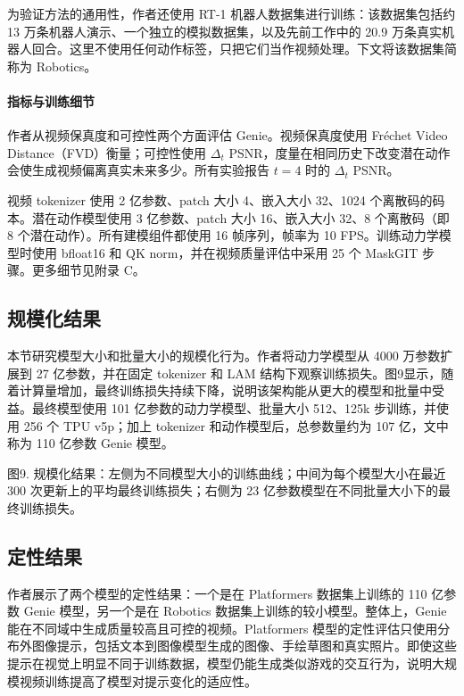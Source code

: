 \documentclass[10pt]{article}
\begin{document}
为验证方法的通用性，作者还使用 RT-1 机器人数据集进行训练：该数据集包括约 13 万条机器人演示、一个独立的模拟数据集，以及先前工作中的 20.9 万条真实机器人回合。这里不使用任何动作标签，只把它们当作视频处理。下文将该数据集简称为 Robotics。

\paragraph{指标与训练细节}

作者从视频保真度和可控性两个方面评估 Genie。视频保真度使用 Fréchet Video Distance（FVD）衡量；可控性使用 $\Delta_t$ PSNR，度量在相同历史下改变潜在动作会使生成视频偏离真实未来多少。所有实验报告 $t=4$ 时的 $\Delta_t$ PSNR。

视频 tokenizer 使用 2 亿参数、patch 大小 4、嵌入大小 32、1024 个离散码的码本。潜在动作模型使用 3 亿参数、patch 大小 16、嵌入大小 32、8 个离散码（即 8 个潜在动作）。所有建模组件都使用 16 帧序列，帧率为 10 FPS。训练动力学模型时使用 bfloat16 和 QK norm，并在视频质量评估中采用 25 个 MaskGIT 步骤。更多细节见附录 C。

\subsection{规模化结果}

本节研究模型大小和批量大小的规模化行为。作者将动力学模型从 4000 万参数扩展到 27 亿参数，并在固定 tokenizer 和 LAM 结构下观察训练损失。图9显示，随着计算量增加，最终训练损失持续下降，说明该架构能从更大的模型和批量中受益。最终模型使用 101 亿参数的动力学模型、批量大小 512、125k 步训练，并使用 256 个 TPU v5p；加上 tokenizer 和动作模型后，总参数量约为 107 亿，文中称为 110 亿参数 Genie 模型。

图9. 规模化结果：左侧为不同模型大小的训练曲线；中间为每个模型大小在最近 300 次更新上的平均最终训练损失；右侧为 23 亿参数模型在不同批量大小下的最终训练损失。

\subsection{定性结果}

作者展示了两个模型的定性结果：一个是在 Platformers 数据集上训练的 110 亿参数 Genie 模型，另一个是在 Robotics 数据集上训练的较小模型。整体上，Genie 能在不同域中生成质量较高且可控的视频。Platformers 模型的定性评估只使用分布外图像提示，包括文本到图像模型生成的图像、手绘草图和真实照片。即使这些提示在视觉上明显不同于训练数据，模型仍能生成类似游戏的交互行为，说明大规模视频训练提高了模型对提示变化的适应性。
\end{document}
